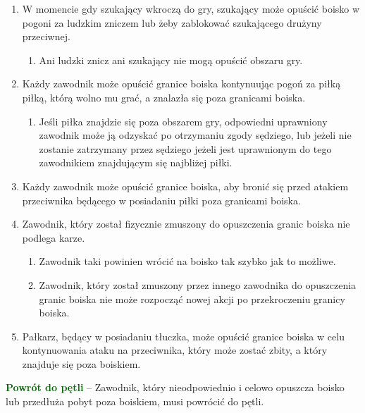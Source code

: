 \documentclass[12pt]{article}
\newcommand\other[1]{\bgroup\textcolor{darkgreen}{\textbf{#1}}}
\begin{document}
\begin{enumerate}
	\item
	      W momencie gdy szukający wkroczą do gry, szukający może opuścić boisko
	      w pogoni za ludzkim zniczem lub żeby zablokować szukającego drużyny
	      przeciwnej.

	      \begin{enumerate}
		      \item
		            Ani ludzki znicz ani szukający nie mogą opuścić obszaru gry.
	      \end{enumerate}
	\item
	      Każdy zawodnik może opuścić granice boiska kontynuując pogoń za piłką
	      piłką, którą wolno mu grać, a znalazła się poza granicami boiska.

	      \begin{enumerate}
		      \item
		            Jeśli piłka znajdzie się poza obszarem gry, odpowiedni uprawniony
		            zawodnik może ją odzyskać po otrzymaniu zgody sędziego, lub jeżeli
		            nie zostanie zatrzymany przez sędziego jeżeli jest uprawnionym do
		            tego zawodnikiem znajdującym się najbliżej piłki.
	      \end{enumerate}
	\item
	      Każdy zawodnik może opuścić granice boiska, aby bronić się przed
	      atakiem przeciwnika będącego w posiadaniu piłki poza granicami boiska.
	\item
	      Zawodnik, który został fizycznie zmuszony do opuszczenia granic boiska
	      nie podlega karze.

	      \begin{enumerate}
		      \item
		            Zawodnik taki powinien wrócić na boisko tak szybko jak to możliwe.
		      \item
		            Zawodnik, który został zmuszony przez innego zawodnika do
		            opuszczenia granic boiska nie może rozpocząć nowej akcji po
		            przekroczeniu granicy boiska.
	      \end{enumerate}
	\item
	      Pałkarz, będący w posiadaniu tłuczka, może opuścić granice boiska w
	      celu kontynuowania ataku na przeciwnika, który może zostać zbity, a
	      który znajduje się poza boiskiem.
\end{enumerate}

\other{Powrót do pętli} -- Zawodnik, który nieodpowiednio i celowo opuszcza
boisko lub przedłuża pobyt poza boiskiem, musi powrócić do pętli.
\end{document}
